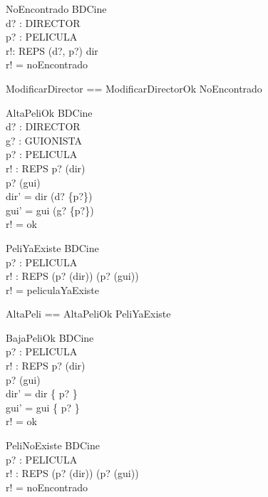 \documentclass[11pt]{article}
\begin{document}
 \begin{schema}{NoEncontrado}
 \Xi BDCine \\
 d? : DIRECTOR \\
 p? : PELICULA \\
 r!: REPS
 \where
 (d?, p?) \notin dir \\
 r! = noEncontrado
 \end{schema}
 
 \begin{zed}
 ModificarDirector == ModificarDirectorOk \lor NoEncontrado
 \end{zed}
 
 \begin{schema}{AltaPeliOk}
 \Delta BDCine \\
 d? : \power DIRECTOR \\
 g? : \power GUIONISTA \\
 p? : PELICULA \\
 r! : REPS
 \where
 p? \notin (\ran dir) \\
 p? \notin (\ran gui) \\
 dir' = dir \cup (d? \cross \{p?\}) \\
 gui' = gui \cup (g? \cross \{p?\}) \\
 r! = ok
 \end{schema}
 
 \begin{schema}{PeliYaExiste}
 \Xi BDCine \\
 p? : PELICULA \\
 r! : REPS
 \where
 (p? \in (\ran dir)) \lor (p? \in (\ran gui)) \\
 r! = peliculaYaExiste
 \end{schema}
 
 \begin{zed}
 AltaPeli == AltaPeliOk \lor PeliYaExiste
 \end{zed}
 
 \begin{schema}{BajaPeliOk}
 \Delta BDCine \\
 p? : PELICULA \\
 r! : REPS
 \where
 p? \in (\ran dir) \\
 p? \in (\ran gui) \\
 dir' = dir \nrres \{ p? \} \\
 gui' = gui \nrres \{ p? \} \\
 r! = ok
 \end{schema}
 
 \begin{schema}{PeliNoExiste}
 \Xi BDCine \\
 p? : PELICULA \\
 r! : REPS
 \where
 (p? \notin (\ran dir)) \lor (p? \notin (\ran gui)) \\
 r! = noEncontrado
 \end{schema}
 
\end{document}
